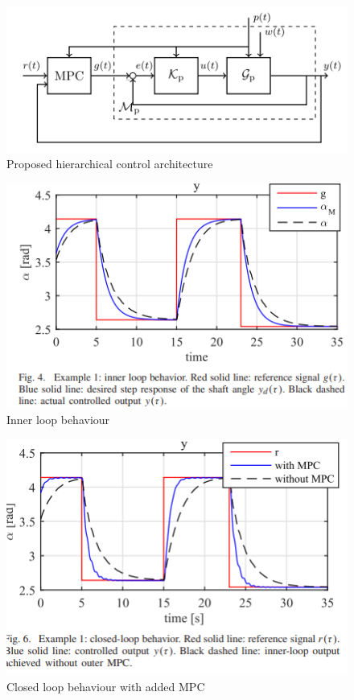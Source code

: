 \documentclass[]{final_report}
\begin{document}
\begin{figure} [h!]
\centerline{\includegraphics[width=.75\textwidth]{Screenshots for related work/constraint_data_driven_control_screenshot1.png}}
\caption{Proposed hierarchical control architecture
\cite{piga2017direct}}
\label{fig:hierarchicalcontroller}
\end{figure}

\begin{figure} [h!]
\centerline{\includegraphics[width=.75\textwidth]{Screenshots for related work/constraint_data_driven_control_screenshot2_innerloop.png}}
\caption{Inner loop behaviour
\cite{piga2017direct}}
\label{fig:innerloopcontroller}
\end{figure}

\begin{figure} [h!]
\centerline{\includegraphics[width=.75\textwidth]{Screenshots for related work/constraint_data_driven_control_screenshot2_usingMPC.png}}
\caption{Closed loop behaviour with added MPC
\cite{piga2017direct}}
\label{fig:controllerwithMPC}
\end{figure}
\end{document}
